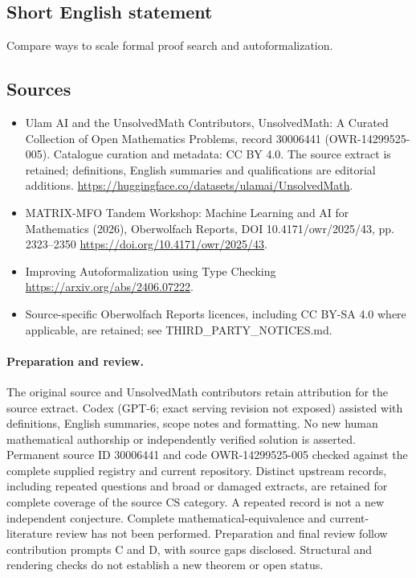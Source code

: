 \documentclass[11pt]{article}
\begin{document}
\subsection{Short English statement}
Compare ways to scale formal proof search and autoformalization.
\subsection{Sources}
\begin{itemize}
\item[\hypertarget{source:30006441:1}{S1}] Ulam AI and the UnsolvedMath Contributors, UnsolvedMath: A Curated Collection of Open Mathematics Problems, record 30006441 (OWR-14299525-005). Catalogue curation and metadata: CC BY 4.0. The source extract is retained; definitions, English summaries and qualifications are editorial additions.
\url{https://huggingface.co/datasets/ulamai/UnsolvedMath}.
\item[\hypertarget{source:30006441:2}{S2}] MATRIX-MFO Tandem Workshop: Machine Learning and AI for Mathematics (2026), Oberwolfach Reports, DOI 10.4171/owr/2025/43, pp. 2323--2350
\url{https://doi.org/10.4171/owr/2025/43}.
\item[\hypertarget{source:30006441:3}{S3}] Improving Autoformalization using Type Checking
\url{https://arxiv.org/abs/2406.07222}.
\item Source-specific Oberwolfach Reports licences, including CC BY-SA 4.0 where applicable, are retained; see THIRD\_PARTY\_NOTICES.md.
\end{itemize}
\paragraph{Preparation and review.}
The original source and UnsolvedMath contributors retain attribution for the source extract. Codex (GPT-6; exact serving revision not exposed) assisted with definitions, English summaries, scope notes and formatting. No new human mathematical authorship or independently verified solution is asserted. Permanent source ID 30006441 and code OWR-14299525-005 checked against the complete supplied registry and current repository. Distinct upstream records, including repeated questions and broad or damaged extracts, are retained for complete coverage of the source CS category. A repeated record is not a new independent conjecture. Complete mathematical-equivalence and current-literature review has not been performed. Preparation and final review follow contribution prompts C and D, with source gaps disclosed. Structural and rendering checks do not establish a new theorem or open status.
\label{end:30006441}
\end{document}
